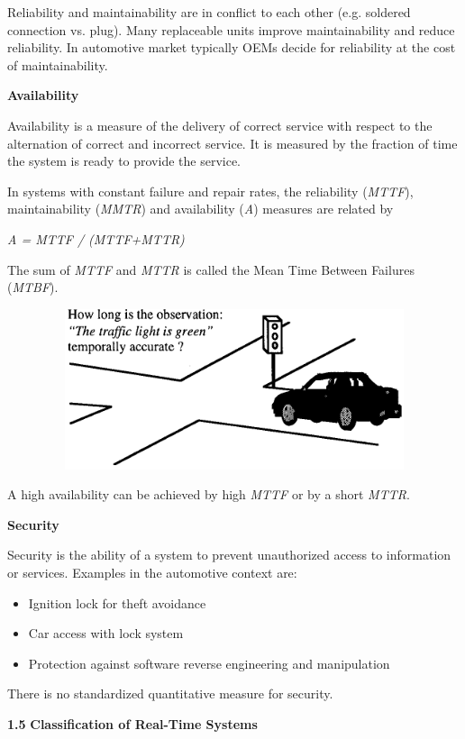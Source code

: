 Reliability and maintainability are in conflict to each other (e.g.
soldered connection vs. plug). Many replaceable units improve
maintainability and reduce reliability. In automotive market typically
OEMs decide for reliability at the cost of maintainability.

\textbf{Availability}

Availability is a measure of the delivery of correct service with
respect to the alternation of correct and incorrect service. It is
measured by the fraction of time the system is ready to provide the
service.

In systems with constant failure and repair rates, the reliability
(\emph{MTTF}), maintainability (\emph{MMTR}) and availability (\emph{A})
measures are related by

\emph{A = MTTF / (MTTF+MTTR)}

The sum of \emph{MTTF} and \emph{MTTR} is called the Mean Time Between
Failures (\emph{MTBF}).

\includegraphics[width=7.63958in,height=1.85347in]{media/Fig_1_2.png}

A high availability can be achieved by high \emph{MTTF} or by a short
\emph{MTTR}.

\textbf{Security}

Security is the ability of a system to prevent unauthorized access to
information or services. Examples in the automotive context are:

\begin{itemize}
\item
  Ignition lock for theft avoidance
\item
  Car access with lock system
\item
  Protection against software reverse engineering and manipulation
\end{itemize}

There is no standardized quantitative measure for security.

\textbf{1.5} \protect\hypertarget{teil6}{}{}\textbf{Classification of
Real-Time Systems}

